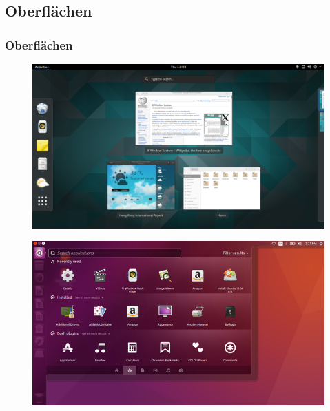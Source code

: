 \subsection{Oberflächen}
\begin{frame}
\frametitle{Oberflächen}

\begin{figure}
 \includegraphics[height=0.7\textheight]{resources/640px-GNOME_Shell.png}
 \end{figure}

\end{frame}
\begin{frame}

\begin{figure}
 \includegraphics[height=0.7\textheight]{resources/640px-App_Lens_on_Ubuntu.png}
 \end{figure}
\end{frame}

